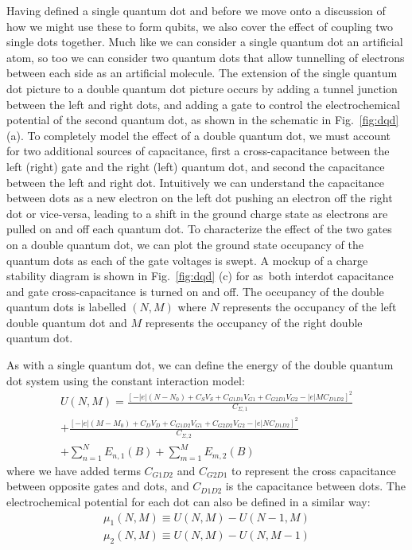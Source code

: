 Having defined a single quantum dot and before we move onto a discussion of how we might use these to form qubits,
we also cover the effect of coupling two single dots together. Much like we can consider a single quantum dot an
artificial atom, so too we can consider two quantum dots that allow tunnelling of electrons between each side as
an artificial molecule. The extension of the single quantum dot picture to a double quantum dot picture occurs by
adding a tunnel junction between the left and right dots, and adding a gate to control the
electrochemical potential of the second quantum dot, as shown in the schematic in Fig.~\ref{fig:dqd} (a).
To completely model the effect of a double quantum dot, we must account for two additional sources of capacitance, first
a cross-capacitance between the left (right) gate and the right (left) quantum dot, and second the capacitance between
the left and right dot. Intuitively we can understand the capacitance between dots as a new electron on the left dot
pushing an electron off the right dot or vice-versa, leading to a shift in the ground charge state as electrons are
pulled on and off each quantum dot. To characterize the effect of the two gates on a double quantum dot, we
can plot the ground state occupancy of the quantum dots as each of the gate voltages is swept. A mockup of a charge
stability diagram is shown in Fig.~\ref{fig:dqd} (c) for as both interdot capacitance and gate cross-capacitance
is turned on and off. The occupancy of the double quantum dots is labelled $(N, M)$ where $N$ represents the
occupancy of the left double quantum dot and $M$ represents the occupancy of the right double quantum dot.

As with a single quantum dot, we can define the energy of the double quantum dot system using the constant
interaction model:
\begin{multline}
  U(N, M) = \frac{[-|e|(N-N_{0}) + C_SV_S + C_{G1D1}V_{G1} + C_{G2D1}V_{G2} - |e|MC_{D1D2}]^2}{C_{\Sigma,1}} \\
          + \frac{[-|e|(M-M_{0}) + C_DV_D + C_{G1D2}V_{G1} + C_{G2D2}V_{G2} - |e|NC_{D1D2}]^2}{C_{\Sigma,2}} \\
          + \sum_{n=1}^N E_{n,1}(B) + \sum_{m=1}^M E_{m,2}(B)
\end{multline}
where we have added terms $C_{G1D2}$ and $C_{G2D1}$ to represent the cross capacitance between opposite
gates and dots, and $C_{D1D2}$ is the capacitance between dots. The electrochemical potential for each dot
can also be defined in a similar way:
\begin{align}
  \mu_1(N, M) \equiv U(N, M) - U(N-1, M) \\
  \mu_2(N, M) \equiv U(N, M) - U(N, M-1)
\end{align}

